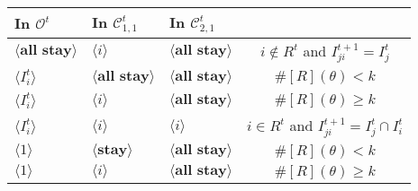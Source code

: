 \documentclass[12pt,letter]{article}
\newcommand{\Kappa}{\mathcal{C}}
\newcommand{\Omicron}{\mathcal{O}}
\theoremstyle{definition}
\theoremstyle{remark}
\theoremstyle{claim}
\begin{document}
\begin{table}[!htbp]
\begin{center}
\begin{tabular}{l l l | c}
\hline
\hline
In $\Omicron^t$			&	In $\Kappa^t_{1,1}$			&			In $\Kappa^t_{2,1}$		&   \\
\hline
$\langle \textbf{all stay} \rangle$  & $\langle i \rangle$	&  $\langle \textbf{all stay} \rangle$ &  $i\notin R^t$ and $I^{t+1}_{ji}=I^t_j$  \\
$\langle I^t_{i} \rangle$  & $\langle \textbf{all stay} \rangle$	&  $\langle \textbf{all stay} \rangle$ &  $\#[R](\theta)< k$ \\
$\langle I^t_{i} \rangle$  & $\langle i \rangle$	&  $\langle \textbf{all stay} \rangle$ &  $\#[R](\theta)\geq k$ \\
$\langle I^t_{i} \rangle$  & $\langle i \rangle$	&  $\langle i \rangle$ &  $i\in R^t$ and $I^{t+1}_{ji}=I^t_j\cap I^t_{i}$ \\
$\langle 1 \rangle$  & $\langle \textbf{stay} \rangle$	&	$\langle \textbf{all stay} \rangle$ &  $\#[R](\theta)< k$    \\
$\langle 1 \rangle$  & $\langle i \rangle$	&	$\langle \textbf{all stay} \rangle$ &  $\#[R](\theta)\geq k$  \\
  \hline
\end{tabular}
\end{center}
\end{table}

\end{document}
